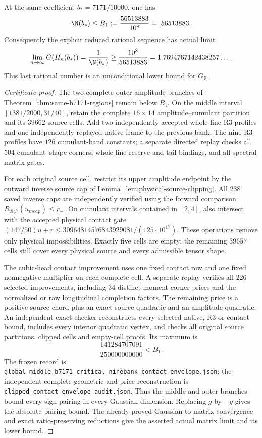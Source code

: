 \begin{theorem}
\label{thm:global-b7171-strengthened}
At the same coefficient $b_*=7171/10000$, one has
\[
 \N(b_*)\le B_1:=\frac{56513883}{10^8}=.56513883.
\]
Consequently the explicit reduced rational sequence has actual limit
\[
 \lim_{n\to\infty}G(H_n(b_*))
 =\frac1{\N(b_*)}
 \ge\frac{10^8}{56513883}
 =1.7694767142438257\ldots .
\]
This last rational number is an unconditional lower bound for
$G_{\mathbb R}$.
\end{theorem}
\begin{proof}[Certificate proof]
The two complete outer amplitude branches of
Theorem~\ref{thm:same-b7171-regions} remain below $B_1$.
On the middle interval $[1381/2000,31/40]$, retain the complete
$16\times14$ amplitude--cumulant partition and its $39662$ source
cells.  Add two independently accepted whole-line R3 profiles and
one independently replayed native frame to the previous bank.
The nine R3 profiles have $126$ cumulant-band constants; a separate
directed replay checks all $504$ cumulant--shape corners, whole-line
reserve and tail bindings, and all spectral matrix gates.

For each original source cell, restrict its upper amplitude endpoint
by the outward inverse source cap of
Lemma~\ref{lem:physical-source-clipping}.  All $238$ saved inverse
caps are independently verified using the forward comparison
$R_{.847}(u_{
m cap})\le r_-$.  On cumulant intervals contained in
$[2,4]$, also intersect with the accepted physical contact gate
$(147/50)u+r\le30964814576843929081/(125\cdot10^{17})$.
These operations remove only physical impossibilities.  Exactly
five cells are empty; the remaining $39657$ cells still cover every
physical source and every admissible tensor shape.

The cubic-head contact improvement uses one fixed contact row and
one fixed nonnegative multiplier on each complete cell.  A separate
replay verifies all $226$ selected improvements, including $34$
distinct moment corner prices and the normalized or raw longitudinal
completion factors.  The remaining price is a positive source
chord plus an exact source quadratic and an amplitude quadratic.
An independent exact checker reconstructs every selected native,
R3 or contact bound, includes every interior quadratic vertex, and
checks all original source partitions, clipped cells and empty-cell
proofs.  Its maximum is
\[
 \frac{141284707091}{250000000000}<B_1.
\]
The frozen record is
\texttt{global\_\allowbreak middle\_\allowbreak b7171\_\allowbreak critical\_\allowbreak ninebank\_\allowbreak contact\_\allowbreak envelope.json};
the independent complete geometric and price reconstruction is
\texttt{clipped\_\allowbreak contact\_\allowbreak envelope\_\allowbreak audit.json}.
Thus the middle and outer branches bound every sign pairing in
every Gaussian dimension.  Replacing $g$ by $-g$ gives the absolute
pairing bound.  The already proved Gaussian-to-matrix convergence
and exact ratio-preserving reductions give the asserted actual
matrix limit and its lower bound.
\end{proof}
